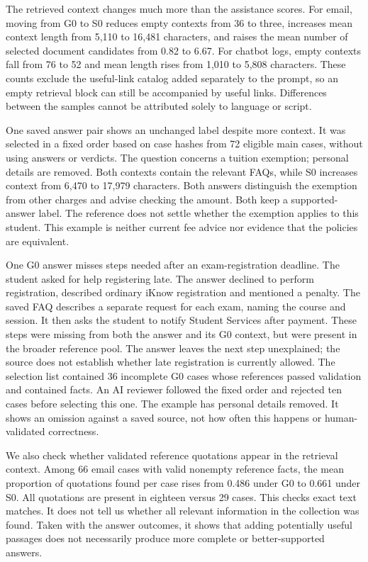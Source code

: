 \documentclass[a4paper,10pt,twocolumn]{article}
\begin{document}
The retrieved context changes much more than the assistance scores. For email, moving from G0 to S0 reduces empty contexts from 36 to three, increases mean context length from 5,110 to 16,481 characters, and raises the mean number of selected document candidates from 0.82 to 6.67. For chatbot logs, empty contexts fall from 76 to 52 and mean length rises from 1,010 to 5,808 characters. These counts exclude the useful-link catalog added separately to the prompt, so an empty retrieval block can still be accompanied by useful links. Differences between the samples cannot be attributed solely to language or script.

One saved answer pair shows an unchanged label despite more context. It was selected in a fixed order based on case hashes from 72 eligible main cases, without using answers or verdicts. The question concerns a tuition exemption; personal details are removed. Both contexts contain the relevant FAQs, while S0 increases context from 6,470 to 17,979 characters. Both answers distinguish the exemption from other charges and advise checking the amount. Both keep a supported-answer label. The reference does not settle whether the exemption applies to this student. This example is neither current fee advice nor evidence that the policies are equivalent.

One G0 answer misses steps needed after an exam-registration deadline. The student asked for help registering late. The answer declined to perform registration, described ordinary iKnow registration and mentioned a penalty. The saved FAQ describes a separate request for each exam, naming the course and session. It then asks the student to notify Student Services after payment. These steps were missing from both the answer and its G0 context, but were present in the broader reference pool. The answer leaves the next step unexplained; the source does not establish whether late registration is currently allowed. The selection list contained 36 incomplete G0 cases whose references passed validation and contained facts. An AI reviewer followed the fixed order and rejected ten cases before selecting this one. The example has personal details removed. It shows an omission against a saved source, not how often this happens or human-validated correctness.

We also check whether validated reference quotations appear in the retrieval context. Among 66 email cases with valid nonempty reference facts, the mean proportion of quotations found per case rises from 0.486 under G0 to 0.661 under S0. All quotations are present in eighteen versus 29 cases. This checks exact text matches. It does not tell us whether all relevant information in the collection was found. Taken with the answer outcomes, it shows that adding potentially useful passages does not necessarily produce more complete or better-supported answers.
\end{document}

